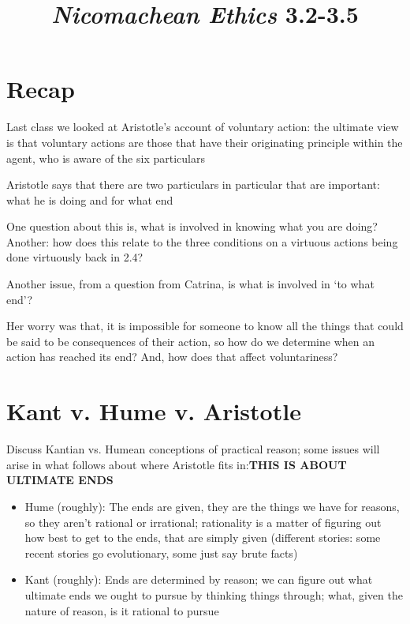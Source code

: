 \documentclass[11pt]{article}
\title{\emph{Nicomachean Ethics} 3.2-3.5}
\author{}
\date{}
\begin{document}
\maketitle

\section*{Recap}

\noindent Last class we looked at Aristotle's account of voluntary action: the ultimate view is that voluntary actions are those that have their originating principle within the agent, who is aware of the six particulars
\vspace*{2mm}

\noindent Aristotle says that there are two particulars in particular that are important: what he is doing and for what end
\vspace*{2mm}

\noindent One question about this is, what is involved in knowing what you are doing? Another: how does this relate to the three conditions on a virtuous actions being done virtuously back in 2.4?
\vspace*{2mm}

\noindent Another issue, from a question from Catrina, is what is involved in `to what end'?
\vspace*{2mm}

\noindent Her worry was that, it is impossible for someone to know all the things that could be said to be consequences of their action, so how do we determine when an action has reached its end? And, how does that affect voluntariness?


\section*{Kant v. Hume v. Aristotle}

\noindent Discuss Kantian vs. Humean conceptions of practical reason; some issues will arise in what follows about where Aristotle fits in:\textbf{THIS IS ABOUT ULTIMATE ENDS}

\begin{itemize}\item{Hume (roughly): The ends are given, they are the things we have for reasons, so they aren't rational or irrational; rationality is a matter of figuring out how best to get to the ends, that are simply given (different stories: some recent stories go evolutionary, some just say brute facts)}\item{Kant (roughly): Ends are determined by reason; we can figure out what ultimate ends we ought to pursue by thinking things through; what, given the nature of reason, is it rational to pursue}\end{itemize}
\end{document}
